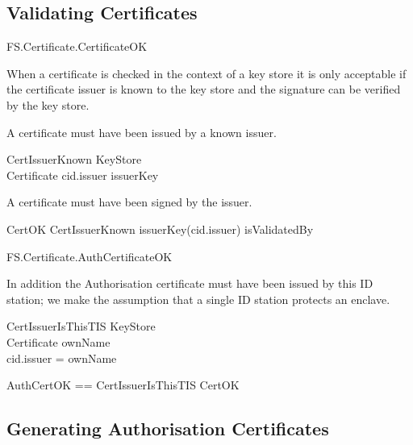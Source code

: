 \subsection{Validating Certificates}

\begin{traceunit}{FS.Certificate.CertificateOK}
\end{traceunit}

When a certificate is checked in the context of a key store it is
only acceptable if the certificate issuer is known to the key store
and the signature can be verified by the key store.

A certificate must have been issued by a known issuer.

\begin{schema}{CertIssuerKnown}
        KeyStore
\\      Certificate
\where
        cid.issuer \in \dom issuerKey
\end{schema}

A certificate must have been signed by the issuer. 

\begin{schema}{CertOK}
        CertIssuerKnown
\where
        issuerKey(cid.issuer) \in isValidatedBy
\end{schema}


\begin{traceunit}{FS.Certificate.AuthCertificateOK}
\end{traceunit}


In addition the Authorisation certificate must have been issued by this ID
station; we make the assumption that a single ID station protects an enclave.

\begin{schema}{CertIssuerIsThisTIS}
        KeyStore
\\      Certificate
\where
        ownName \neq \Nil
\\      cid.issuer = \The ownName
\end{schema}

\begin{zed}
        AuthCertOK == CertIssuerIsThisTIS \land CertOK
\end{zed}

\subsection{Generating Authorisation Certificates}

